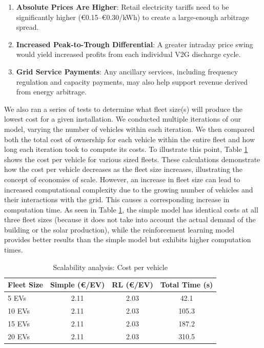 \begin{enumerate}
\item \textbf{Absolute Prices Are Higher}: Retail electricity tariffs need to be significantly higher (€0.15--€0.30/kWh) to create a large-enough arbitrage spread.
\item \textbf{Increased Peak-to-Trough Differential}: A greater intraday price swing would yield increased profits from each individual V2G discharge cycle.
\item \textbf{Grid Service Payments}: Any ancillary services, including frequency regulation and capacity payments, may also help support revenue derived from energy arbitrage.
\end{enumerate}

We also ran a series of tests to determine what fleet size(s) will produce the lowest cost for a given installation. We conducted multiple iterations of our model, varying the number of vehicles within each iteration. We then compared both the total cost of ownership for each vehicle within the entire fleet and how long each iteration took to compute its costs.
To illustrate this point, Table \ref{tab:fleet_scaling} shows the cost per vehicle for various sized fleets. These calculations demonstrate how the cost per vehicle decreases as the fleet size increases, illustrating the concept of economies of scale. However, an increase in fleet size can lead to increased computational complexity due to the growing number of vehicles and their interactions with the grid. This causes a corresponding increase in computation time. As seen in Table \ref{tab:fleet_scaling}, the simple model has identical costs at all three fleet sizes (because it does not take into account the actual demand of the building or the solar production), while the reinforcement learning model provides better results than the simple model but exhibits higher computation times.

\begin{table}[H]
\centering
\caption{Scalability analysis: Cost per vehicle}
\label{tab:fleet_scaling}
\begin{tabular}{@{}lccc@{}}
\toprule
\textbf{Fleet Size} & \textbf{Simple (€/EV)} & \textbf{RL (€/EV)} & \textbf{Total Time (s)} \\
\midrule
5 EVs & 2.11 & 2.03 & 42.1 \\
10 EVs & 2.11 & 2.03 & 105.3 \\
15 EVs & 2.11 & 2.03 & 187.2 \\
20 EVs & 2.11 & 2.03 & 310.5 \\
\bottomrule
\end{tabular}
\end{table}

